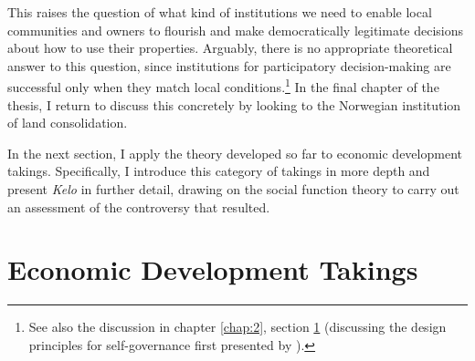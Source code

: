 This raises the question of what kind of institutions we need to enable local communities and owners to  flourish and make democratically legitimate decisions about how to use their properties. Arguably, there is no appropriate theoretical answer to this question, since institutions for participatory decision-making are successful only when they match local conditions.\footnote{See also the discussion in chapter \ref{chap:2}, section \ref{sec:2:6} (discussing the design principles for self-governance first presented by \cite{ostrom90}).} In the final chapter of the thesis, I return to discuss this concretely by looking to the Norwegian institution of land consolidation.

In the next section, I apply the theory developed so far to economic development takings. Specifically, I introduce this category of takings in more depth and present {\it Kelo} in further detail, drawing on the social function theory to carry out an assessment of the controversy that resulted.

\section{Economic Development Takings}\label{sec:2:6}

